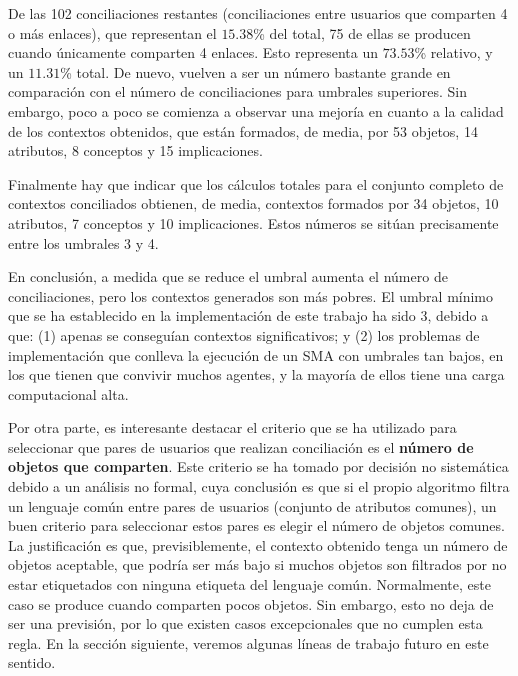 De las 102 conciliaciones restantes (conciliaciones entre usuarios que comparten 4 o más enlaces), que representan el $15.38$\% del total, 75 de ellas se producen cuando únicamente comparten 4 enlaces. Esto representa un $73.53$\% relativo, y un $11.31$\% total. De nuevo, vuelven a ser un número bastante grande en comparación con el número de conciliaciones para umbrales superiores. Sin embargo, poco a poco se comienza a observar una mejoría en cuanto a la calidad de los contextos obtenidos, que están formados, de media, por 53 objetos, 14 atributos, 8 conceptos y 15 implicaciones.

Finalmente hay que indicar que los cálculos totales para el conjunto completo de contextos conciliados obtienen, de media, contextos formados por 34 objetos, 10 atributos, 7 conceptos y 10 implicaciones. Estos números se sitúan precisamente entre los umbrales 3 y 4.

En conclusión, a medida que se reduce el umbral aumenta el número de conciliaciones, pero los contextos generados son más pobres. El umbral mínimo que se ha establecido en la implementación de este trabajo ha sido 3, debido a que: (1) apenas se conseguían contextos significativos; y (2) los problemas de implementación que conlleva la ejecución de un SMA con umbrales tan bajos, en los que tienen que convivir muchos agentes, y la mayoría de ellos tiene una carga computacional alta.

Por otra parte, es interesante destacar el criterio que se ha utilizado para seleccionar que pares de usuarios que realizan conciliación es el {\bf número de objetos que comparten}. Este criterio se ha tomado por decisión no sistemática debido a un análisis no formal, cuya conclusión es que si el propio algoritmo filtra un lenguaje común entre pares de usuarios (conjunto de atributos comunes), un buen criterio para seleccionar estos pares es elegir el número de objetos comunes. La justificación es que, previsiblemente, el contexto obtenido tenga un número de objetos aceptable, que podría ser más bajo si muchos objetos son filtrados por no estar etiquetados con ninguna etiqueta del lenguaje común. Normalmente, este caso se produce cuando comparten pocos objetos. Sin embargo, esto no deja de ser una previsión, por lo que existen casos excepcionales que no cumplen esta regla. En la sección siguiente, veremos algunas líneas de trabajo futuro en este sentido.

